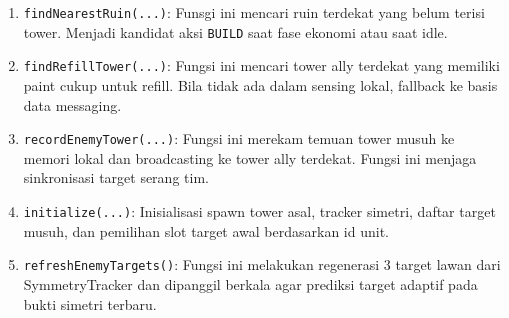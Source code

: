 \begin{enumerate}
	\item \texttt{findNearestRuin(...)}:
	      Funsgi ini mencari ruin terdekat yang belum terisi tower. Menjadi kandidat aksi \texttt{BUILD} saat fase ekonomi atau saat idle.

	\item \texttt{findRefillTower(...)}:
	      Fungsi ini mencari tower ally terdekat yang memiliki paint cukup untuk refill. Bila tidak ada dalam sensing lokal, fallback ke basis data messaging.

	\item \texttt{recordEnemyTower(...)}:
	      Fungsi ini merekam temuan tower musuh ke memori lokal dan broadcasting ke tower ally terdekat. Fungsi ini menjaga sinkronisasi target serang tim.

	\item \texttt{initialize(...)}:
	      Inisialisasi spawn tower asal, tracker simetri, daftar target musuh, dan pemilihan slot target awal berdasarkan id unit.

	\item \texttt{refreshEnemyTargets()}:
	      Fungsi ini melakukan regenerasi 3 target lawan dari SymmetryTracker dan dipanggil berkala agar prediksi target adaptif pada bukti simetri terbaru.
\end{enumerate}

